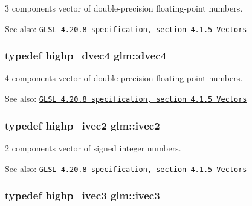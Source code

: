 3 components vector of double-precision floating-point numbers.

\begin{Desc}
\item[See also:]\href{http://www.opengl.org/registry/doc/GLSLangSpec.4.20.8.pdf}{\tt GLSL 4.20.8 specification, section 4.1.5 Vectors} \end{Desc}
\hypertarget{group__core__types_g0824ceed7ec3b2fba89765501c1540b5}{
\subsubsection[dvec4]{\setlength{\rightskip}{0pt plus 5cm}typedef highp\_\-dvec4 {\bf glm::dvec4}}}
\label{group__core__types_g0824ceed7ec3b2fba89765501c1540b5}


4 components vector of double-precision floating-point numbers.

\begin{Desc}
\item[See also:]\href{http://www.opengl.org/registry/doc/GLSLangSpec.4.20.8.pdf}{\tt GLSL 4.20.8 specification, section 4.1.5 Vectors} \end{Desc}
\hypertarget{group__core__types_g9e6ce9cfc7919976b318197e18d8a065}{
\subsubsection[ivec2]{\setlength{\rightskip}{0pt plus 5cm}typedef highp\_\-ivec2 {\bf glm::ivec2}}}
\label{group__core__types_g9e6ce9cfc7919976b318197e18d8a065}


2 components vector of signed integer numbers.

\begin{Desc}
\item[See also:]\href{http://www.opengl.org/registry/doc/GLSLangSpec.4.20.8.pdf}{\tt GLSL 4.20.8 specification, section 4.1.5 Vectors} \end{Desc}
\hypertarget{group__core__types_g6e12a4ca00d696f07da1df4eb73e0fe8}{
\subsubsection[ivec3]{\setlength{\rightskip}{0pt plus 5cm}typedef highp\_\-ivec3 {\bf glm::ivec3}}}
\label{group__core__types_g6e12a4ca00d696f07da1df4eb73e0fe8}


